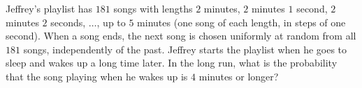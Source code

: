 Jeffrey's playlist has $181$ songs with lengths $2$ minutes, $2$ minutes $1$ second, $2$ minutes $2$ seconds, $\dots$, up to $5$ minutes (one song of each length, in steps of one second). When a song ends, the next song is chosen uniformly at random from all $181$ songs, independently of the past. Jeffrey starts the playlist when he goes to sleep and wakes up a long time later. In the long run, what is the probability that the song playing when he wakes up is $4$ minutes or longer?

